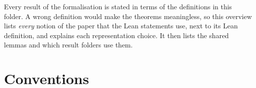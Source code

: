 

\paperversion

\noindent Every result of the formalisation is stated in terms of the definitions in this folder. A wrong
definition would make the theorems meaningless, so this overview lists \emph{every} notion of the paper that
the Lean statements use, next to its Lean definition, and explains each representation choice. It then
lists the shared lemmas and which result folders use them.

\section{Conventions}
